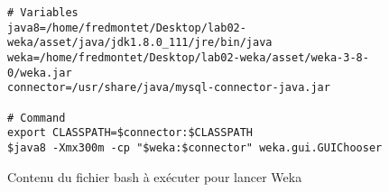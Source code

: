 \begin{figure}[H]
\centering
\begin{lstlisting}	
# Variables
java8=/home/fredmontet/Desktop/lab02-weka/asset/java/jdk1.8.0_111/jre/bin/java
weka=/home/fredmontet/Desktop/lab02-weka/asset/weka-3-8-0/weka.jar
connector=/usr/share/java/mysql-connector-java.jar
 
# Command
export CLASSPATH=$connector:$CLASSPATH
$java8 -Xmx300m -cp "$weka:$connector" weka.gui.GUIChooser
\end{lstlisting}
\caption{Contenu du fichier bash à exécuter pour lancer Weka}
\label{lst:shell}
\end{figure}

